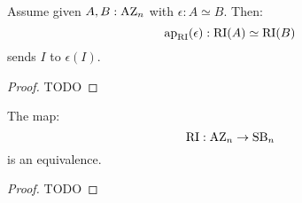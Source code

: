 \begin{lemma}
Assume given $A,B:\mathrm{AZ}_n$ with $\epsilon:A\simeq B$. Then:
\[\mathrm{ap}_{\mathrm{RI}}(\epsilon) : \mathrm{RI}(A) \simeq \mathrm{RI}(B)\]
sends $I$ to $\epsilon(I)$.
\end{lemma}

\begin{proof}
TODO
\end{proof}

\begin{proposition}\label{right-ideal-is-equivalence}
The map:
\[\mathrm{RI}:\mathrm{AZ}_n\to\mathrm{SB}_n\]
is an equivalence.
\end{proposition}

\begin{proof}
TODO
\end{proof}